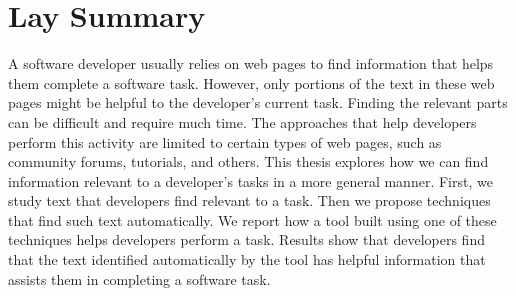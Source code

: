 

\chapter{Lay Summary}

A software developer usually relies on web pages to find information that helps them complete a software task. 
However, only portions of the text in these web pages might be helpful to the developer's current task.
Finding the relevant parts can be difficult and require much time. The approaches that help developers perform this activity are limited to certain types of web pages, such as community forums, tutorials, and others. 
This thesis explores how we can find information relevant to a developer's tasks in a more general manner. 
First, we study text that developers find relevant to a task. 
Then we propose techniques that find such text automatically. 
We report how a tool built using one of these techniques helps developers perform a task. 
Results show that developers find that the text  identified automatically by the tool has helpful information that assists them in completing a software task.
